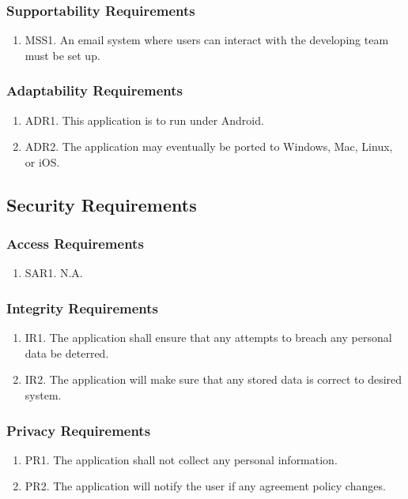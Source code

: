 \documentclass[]{article}
\begin{document}
\subsubsection{Supportability Requirements}
\begin{enumerate}
	\item MSS1. An email system where users can interact with the developing team must be set up.
\end{enumerate}

\subsubsection{Adaptability Requirements}
\begin{enumerate}
	\item ADR1. This application is to run under Android.
	\item ADR2. The application may eventually be ported to Windows, Mac, Linux, or iOS.
\end{enumerate}

\subsection{Security Requirements}
\subsubsection{Access Requirements}
\begin{enumerate}
	\item SAR1. N.A.
\end{enumerate}

\subsubsection{Integrity Requirements}
\begin{enumerate}
	\item IR1. The application shall ensure that any attempts to breach any personal data be deterred.
	\item IR2. The application will make sure that any stored data is correct to desired system.
\end{enumerate}

\subsubsection{Privacy Requirements}
\begin{enumerate}
	\item PR1. The application shall not collect any personal information.
	\item PR2. The application will notify the user if any agreement policy changes.
\end{enumerate}
\end{document}
